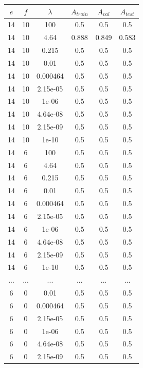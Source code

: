 \begin{itemize}
        \begin{table}[ht]
        \centering
        \begin{tabular}{ |c|c|c|c|c|c| }
        \hline
        $e$ & $f$ & $\lambda$ & $A_{train}$ & $A_{val}$ & $A_{test}$ \\
        \hline
        14 & 10 & 100 & 0.5 & 0.5 & 0.5 \\
        14 & 10 & 4.64 & 0.888 & 0.849 & 0.583 \\
        14 & 10 & 0.215 & 0.5 & 0.5 & 0.5 \\
        14 & 10 & 0.01 & 0.5 & 0.5 & 0.5 \\
        14 & 10 & 0.000464 & 0.5 & 0.5 & 0.5 \\
        14 & 10 & 2.15e-05 & 0.5 & 0.5 & 0.5 \\
        14 & 10 & 1e-06 & 0.5 & 0.5 & 0.5 \\
        14 & 10 & 4.64e-08 & 0.5 & 0.5 & 0.5 \\
        14 & 10 & 2.15e-09 & 0.5 & 0.5 & 0.5 \\
        14 & 10 & 1e-10 & 0.5 & 0.5 & 0.5 \\
        14 & 6 & 100 & 0.5 & 0.5 & 0.5 \\
        14 & 6 & 4.64 & 0.5 & 0.5 & 0.5 \\
        14 & 6 & 0.215 & 0.5 & 0.5 & 0.5 \\
        14 & 6 & 0.01 & 0.5 & 0.5 & 0.5 \\
        14 & 6 & 0.000464 & 0.5 & 0.5 & 0.5 \\
        14 & 6 & 2.15e-05 & 0.5 & 0.5 & 0.5 \\
        14 & 6 & 1e-06 & 0.5 & 0.5 & 0.5 \\
        14 & 6 & 4.64e-08 & 0.5 & 0.5 & 0.5 \\
        14 & 6 & 2.15e-09 & 0.5 & 0.5 & 0.5 \\
        14 & 6 & 1e-10 & 0.5 & 0.5 & 0.5 \\
        ... & ... & ... & ... & ... & ... \\
        6 & 0 & 0.01 & 0.5 & 0.5 & 0.5 \\
        6 & 0 & 0.000464 & 0.5 & 0.5 & 0.5 \\
        6 & 0 & 2.15e-05 & 0.5 & 0.5 & 0.5 \\
        6 & 0 & 1e-06 & 0.5 & 0.5 & 0.5 \\
        6 & 0 & 4.64e-08 & 0.5 & 0.5 & 0.5 \\
        6 & 0 & 2.15e-09 & 0.5 & 0.5 & 0.5 \\

\end{tabular}
\end{table}
\end{itemize}
